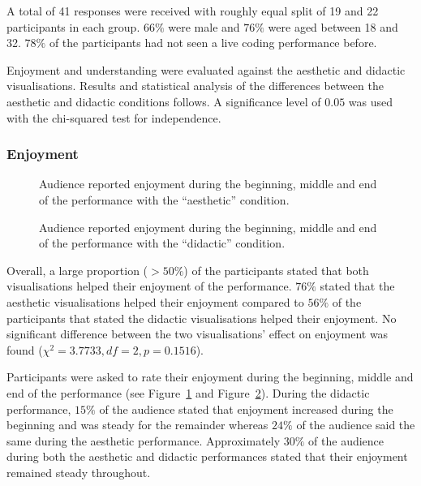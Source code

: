 \documentclass{sig-alternate}
\begin{document}
A total of 41 responses were received with roughly equal split of 19 and 22 participants in each group. $66\%$ were male and $76\%$ were aged between 18 and 32. $78\%$ of the participants had not seen a live coding performance before.

Enjoyment and understanding were evaluated against the aesthetic and didactic visualisations. Results and statistical analysis of the differences between the aesthetic and didactic conditions follows. A significance level of $0.05$ was used with the chi-squared test for independence.

\subsubsection{Enjoyment}

\begin{figure}
\centering
{}
\caption{Audience reported enjoyment during the beginning, middle and end of the performance with the ``aesthetic'' condition.}
\label{fig:aesthetic-enjoyment}
\end{figure}

\begin{figure}
\centering
{}
\caption{Audience reported enjoyment during the beginning, middle and end of the performance with the ``didactic'' condition.}
\label{fig:didactic-enjoyment}
\end{figure}

Overall, a large proportion ($> 50\%$) of the participants stated that both visualisations helped their enjoyment of the performance. $76\%$ stated that the aesthetic visualisations helped their enjoyment compared to $56\%$ of the participants that stated the didactic visualisations helped their enjoyment. No significant difference between the two visualisations' effect on enjoyment was found ($\chi^2=3.7733,df=2,p=0.1516$).

Participants were asked to rate their enjoyment during the beginning, middle and end of the performance (see Figure~\ref{fig:aesthetic-enjoyment} and Figure~\ref{fig:didactic-enjoyment}). During the didactic performance, $15\%$ of the audience stated that enjoyment increased during the beginning and was steady for the remainder whereas $24\%$ of the audience said the same during the aesthetic performance. Approximately $30\%$ of the audience during both the aesthetic and didactic performances stated that their enjoyment remained steady throughout.
\end{document}
